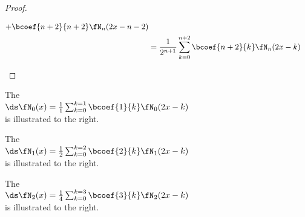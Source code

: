 \begin{proof}
\begin{enumerate}
\begin{align*}
{{               +      \bcoef{n+2}{n+2}\fN_n(2x-n-2)
              }}
      \\&=\frac{1}{2^{n+1}}\sum_{k=0}^{n+2}\bcoef{n+2}{k} \fN_n(2x-k)
    \end{align*}
\end{enumerate}
\end{proof}

\begin{minipage}{\tw-80mm}
\begin{example}\footnotemark
The  
\\\indentx$\ds\fN_0(x) = \frac{1}{1}\sum_{k=0}^{k=1} \bcoef{1}{k} \fN_0(2x-k)$\\
is illustrated to the right.
\end{example}%
\end{minipage}

\begin{minipage}{\tw-80mm}
\begin{example}\footnotemark
The  
\\\indentx$\ds\fN_1(x) = \frac{1}{2}\sum_{k=0}^{k=2} \bcoef{2}{k} \fN_1(2x-k)$\\
is illustrated to the right.
\end{example}%
\end{minipage}

\begin{minipage}{\tw-80mm}
\begin{example}%
The  
\\\indentx$\ds\fN_2(x) = \frac{1}{4}\sum_{k=0}^{k=3} \bcoef{3}{k} \fN_2(2x-k)$\\
is illustrated to the right.
\end{example}%
\end{minipage}

